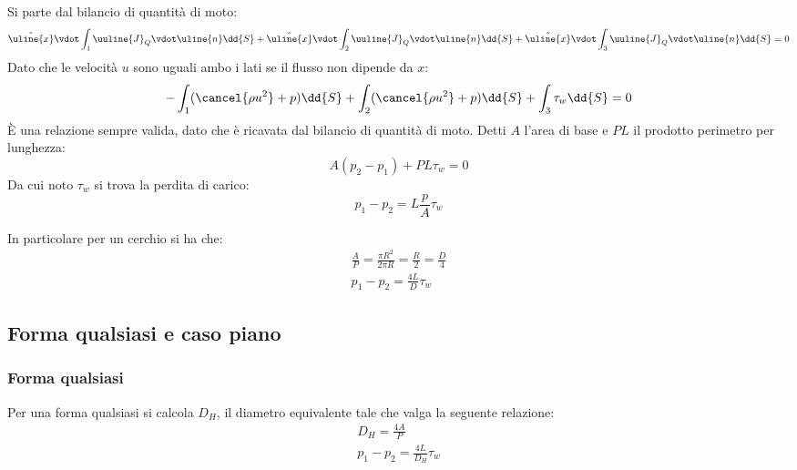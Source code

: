% 
Si parte dal bilancio di quantità di moto:
%
	\begin{equation*}
		\hat{\uline{x}} \vdot \int_1 \uuline{J}_Q \vdot \uline{n} \dd{S} + \hat{\uline{x}} \vdot \int_2 \uuline{J}_Q \vdot \uline{n} \dd{S} + \hat{\uline{x}} \vdot \int_3 \uuline{J}_Q \vdot \uline{n} \dd{S} = 0
	\end{equation*}
%
Dato che le velocità $u$ sono uguali ambo i lati se il flusso non dipende da $x$:
%
	\begin{equation*}
		- \int_1 (\cancel{\rho u^2} + p) \dd{S} + \int_2 (\cancel{\rho u^2}  + p)\dd{S} + \int_3 \tau_w \dd{S} = 0
	\end{equation*}
%
È una relazione sempre valida, dato che è ricavata dal bilancio di quantità di moto.
Detti $A$ l'area di base e $PL$ il prodotto perimetro per lunghezza:
%
	\begin{equation*}
		A (p_2 - p_1) + P L \tau_w = 0
	\end{equation*}
%
Da cui noto $\tau_w$ si trova la perdita di carico:
%
	\begin{equation*}
		p_1 - p_2 = L \frac{p}{A} \tau_w
	\end{equation*}
%

In particolare per un cerchio si ha che:
%
	\begin{equation*}
		\begin{gathered}
			\frac{A}{P} = \frac{\pi R^2}{2 \pi R} = \frac{R}{2} = \frac{D}{4}\\
			p_1 - p_2 = \frac{4 L}{D} \tau_w
		\end{gathered}
	\end{equation*}
%

\subsection{Forma qualsiasi e caso piano}
\subsubsection{Forma qualsiasi}
Per una forma qualsiasi si calcola $D_H$, il diametro equivalente tale che valga la seguente relazione:
%
	\begin{equation*}
		\begin{gathered}
			D_H = \frac{4 A}{P}\\
			p_1 - p_2 = \frac{4L}{D_H} \tau_w
		\end{gathered}
	\end{equation*}
%

